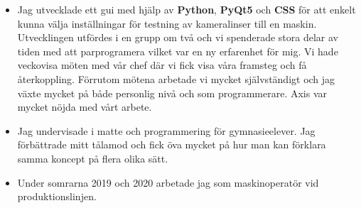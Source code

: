 \documentclass[10pt,a4paper,ragged2e]{altacv}
\begin{document}
\divider

\begin{itemize}
  \item Jag utvecklade ett gui med hjälp av \textbf{Python}, \textbf{PyQt5} och \textbf{CSS} för att enkelt kunna
  välja inställningar för testning av kameralinser till en maskin. Utvecklingen utfördes i en grupp om två och vi spenderade
  stora delar av tiden med att parprogramera vilket var en ny erfarenhet för mig. Vi hade veckovisa möten med vår chef
  där vi fick visa våra framsteg och få återkoppling. Förrutom mötena arbetade vi mycket självständigt och jag växte 
  mycket på både personlig nivå och som programmerare. Axis var mycket nöjda med vårt arbete.
\end{itemize}

\divider

    \begin{itemize}
    \item Jag undervisade i matte och programmering för gymnasieelever. 
    Jag förbättrade mitt tålamod och fick öva mycket på hur man kan förklara 
    samma koncept på flera olika sätt.
\end{itemize}

\divider

\begin{itemize}
    \item Under somrarna 2019 och 2020 arbetade jag som maskinoperatör vid produktionslinjen.
\end{itemize}

\newpage
\end{document}
